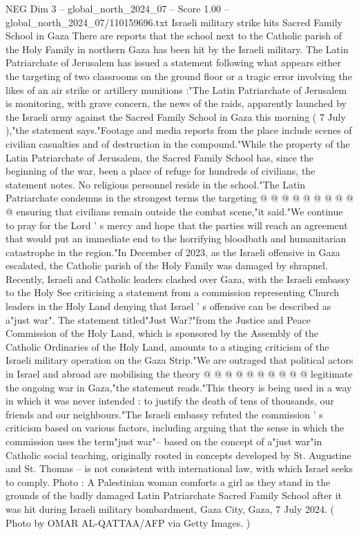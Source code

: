 \begin{textsample}{NEG Dim 3 – global\_north\_2024\_07 – Score 1.00 – global\_north\_2024\_07/110159696.txt}  \label{ex:f3_neg_374}
Israeli military strike hits Sacred Family School in Gaza There are reports that the school next to the Catholic parish of the Holy Family in northern Gaza has been hit by the Israeli military.
The Latin Patriarchate of Jerusalem has issued a statement following what appears either the targeting of two classrooms on the ground floor or a tragic error involving the likes of an air strike or artillery munitions :"The Latin Patriarchate of Jerusalem is monitoring, with grave concern, the news of the raids, apparently launched by the Israeli army against the Sacred Family School in Gaza this morning ( 7 July ),"the statement says."Footage and media reports from the place include scenes of civilian casualties and of destruction in the compound."While the property of the Latin Patriarchate of Jerusalem, the Sacred Family School has, since the beginning of the war, been a place of refuge for hundreds of civilians, the statement notes.
No religious personnel reside in the school."The Latin Patriarchate condemns in the strongest terms the targeting @ @ @ @ @ @ @ @ @ @ ensuring that civilians remain outside the combat scene,"it said."We continue to pray for the Lord ' s mercy and hope that the parties will reach an agreement that would put an immediate end to the horrifying bloodbath and humanitarian catastrophe in the region."In December of 2023, as the Israeli offensive in Gaza escalated, the Catholic parish of the Holy Family was damaged by shrapnel.
Recently, Israeli and Catholic leaders clashed over Gaza, with the Israeli embassy to the Holy See criticising a statement from a commission representing Church leaders in the Holy Land denying that Israel ' s offensive can be described as a"just war".
The statement titled"Just War?"from the Justice and Peace Commission of the Holy Land, which is sponsored by the Assembly of the Catholic Ordinaries of the Holy Land, amounts to a stinging criticism of the Israeli military operation on the Gaza Strip."We are outraged that political actors in Israel and abroad are mobilising the theory @ @ @ @ @ @ @ @ @ @ legitimate the ongoing war in Gaza,"the statement reads."This theory is being used in a way in which it was never intended : to justify the death of tens of thousands, our friends and our neighbours."The Israeli embassy refuted the commission ' s criticism based on various factors, including arguing that the sense in which the commission uses the term"just war"-- based on the concept of a"just war"in Catholic social teaching, originally rooted in concepts developed by St.
Augustine and St.
Thomas -- is not consistent with international law, with which Israel seeks to comply.
Photo : A Palestinian woman comforts a girl as they stand in the grounds of the badly damaged Latin Patriarchate Sacred Family School after it was hit during Israeli military bombardment, Gaza City, Gaza, 7 July 2024. ( Photo by OMAR AL-QATTAA/AFP via Getty Images. )

\end{textsample}
